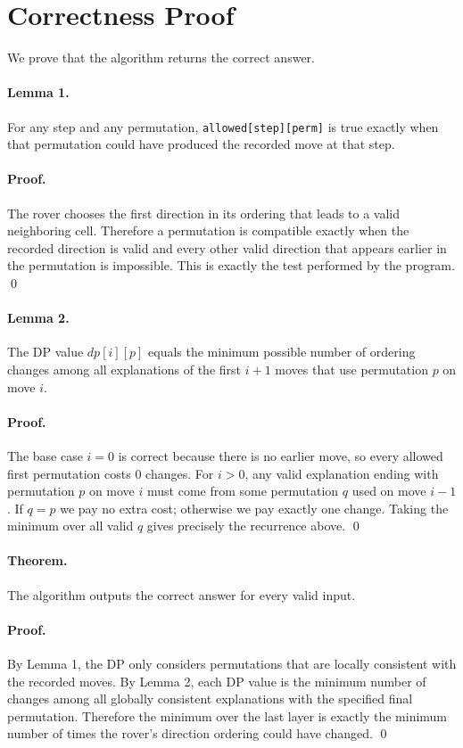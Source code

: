 \documentclass[11pt]{article}
\begin{document}
\section*{Correctness Proof}

We prove that the algorithm returns the correct answer.

\paragraph{Lemma 1.}
For any step and any permutation, \texttt{allowed[step][perm]} is true exactly when that permutation
could have produced the recorded move at that step.

\paragraph{Proof.}
The rover chooses the first direction in its ordering that leads to a valid neighboring cell. Therefore a
permutation is compatible exactly when the recorded direction is valid and every other valid direction that
appears earlier in the permutation is impossible. This is exactly the test performed by the program. \qed

\paragraph{Lemma 2.}
The DP value $dp[i][p]$ equals the minimum possible number of ordering changes among all explanations
of the first $i+1$ moves that use permutation $p$ on move $i$.

\paragraph{Proof.}
The base case $i=0$ is correct because there is no earlier move, so every allowed first permutation costs
$0$ changes. For $i>0$, any valid explanation ending with permutation $p$ on move $i$ must come from
some permutation $q$ used on move $i-1$. If $q=p$ we pay no extra cost; otherwise we pay exactly one
change. Taking the minimum over all valid $q$ gives precisely the recurrence above. \qed

\paragraph{Theorem.}
The algorithm outputs the correct answer for every valid input.

\paragraph{Proof.}
By Lemma 1, the DP only considers permutations that are locally consistent with the recorded moves.
By Lemma 2, each DP value is the minimum number of changes among all globally consistent explanations
with the specified final permutation. Therefore the minimum over the last layer is exactly the minimum
number of times the rover's direction ordering could have changed. \qed
\end{document}
